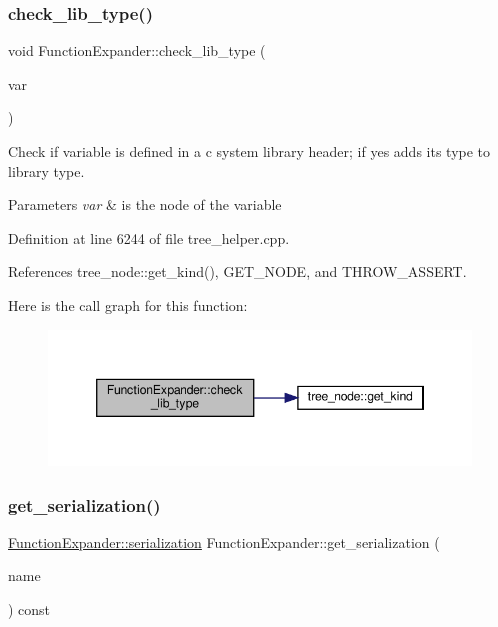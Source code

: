 \subsubsection{\texorpdfstring{check\+\_\+lib\+\_\+type()}{check\_lib\_type()}}
{\footnotesize\ttfamily void Function\+Expander\+::check\+\_\+lib\+\_\+type (\begin{DoxyParamCaption}\item[{const \hyperlink{tree__node_8hpp_a6ee377554d1c4871ad66a337eaa67fd5}{tree\+\_\+node\+Ref} \&}]{var }\end{DoxyParamCaption})}



Check if variable is defined in a c system library header; if yes adds its type to library type. 


\begin{DoxyParams}{Parameters}
{\em var} & is the node of the variable \\
\hline
\end{DoxyParams}


Definition at line 6244 of file tree\+\_\+helper.\+cpp.



References tree\+\_\+node\+::get\+\_\+kind(), G\+E\+T\+\_\+\+N\+O\+DE, and T\+H\+R\+O\+W\+\_\+\+A\+S\+S\+E\+RT.

Here is the call graph for this function\+:
\nopagebreak
\begin{figure}[H]
\begin{center}
\leavevmode
\includegraphics[width=346pt]{d5/d38/classFunctionExpander_aff5d724386bc6bda3ceb080d8b20889d_cgraph}
\end{center}
\end{figure}
\mbox{\label{classFunctionExpander_a33dd15431d0a654915983727430115fb}} 
\subsubsection{\texorpdfstring{get\+\_\+serialization()}{get\_serialization()}}
{\footnotesize\ttfamily \hyperlink{classFunctionExpander_a2b421dee6238b8f68b6ab29b87bc00d0}{Function\+Expander\+::serialization} Function\+Expander\+::get\+\_\+serialization (\begin{DoxyParamCaption}\item[{const std\+::string \&}]{name }\end{DoxyParamCaption}) const}



